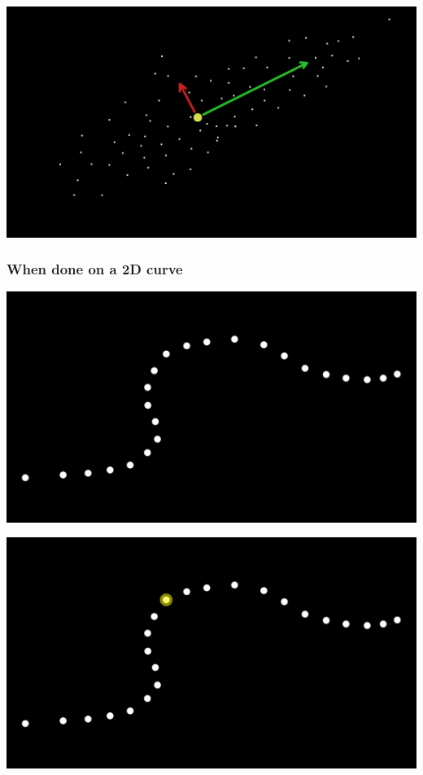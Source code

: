\documentclass[11pt]{article}
\begin{document}
\begin{center}
\includegraphics[width=.9\linewidth]{./images/pca_expl_img_points_mean_arrows.png}
\end{center}

\subsubsection*{When done on a 2D curve}
\label{sec:org6acdac4}

\begin{center}
\includegraphics[width=.9\linewidth]{./images/pca_expl_line_points.png}
\end{center}

\begin{center}
\includegraphics[width=.9\linewidth]{./images/pca_expl_line_points_seleceted.png}
\end{center}
\end{document}
